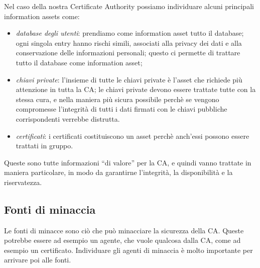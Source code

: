 \documentclass{article}
\begin{document}
Nel caso della nostra Certificate Authority possiamo individuare alcuni principali information assets come:
\begin{itemize}
\item \emph{database degli utenti}: prendiamo come information asset tutto il database; ogni singola entry hanno rischi simili, associati alla privacy dei dati e alla conservazione delle informazioni personali; questo ci permette di trattare tutto il database come information asset;
\item \emph{chiavi private}: l'insieme di tutte le chiavi private è l'asset che richiede più attenzione in tutta la CA; le chiavi private devono essere trattate tutte con la stessa cura, e nella maniera più sicura possibile perchè se vengono compromesse l'integrità di tutti i dati firmati con le chiavi pubbliche corrispondenti verrebbe distrutta.
\item \emph{certificati}: i certificati costituiscono un asset perchè anch'essi possono essere trattati in gruppo. 
\end{itemize}

Queste sono tutte informazioni ``di valore'' per la CA, e quindi vanno trattate in maniera particolare, in modo da garantirne l'integrità, la disponibilità e la riservatezza.

\subsection{Fonti di minaccia}

Le fonti di minacce sono ciò che può minacciare la sicurezza della CA. Queste potrebbe essere ad esempio un agente, che vuole qualcosa dalla CA, come ad esempio un certificato. Individuare gli agenti di minaccia è molto importante per arrivare poi alle fonti.
\end{document}
